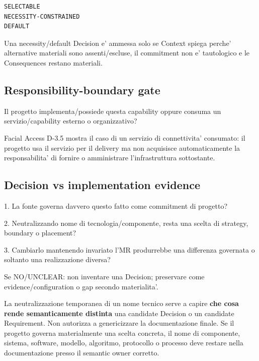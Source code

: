 \documentclass[11pt,a4paper]{article}
\begin{document}
\begin{lstlisting}
SELECTABLE
NECESSITY-CONSTRAINED
DEFAULT
\end{lstlisting}

Una necessity/default Decision e' ammessa solo se Context spiega perche' alternative materiali sono assenti/escluse, il commitment non e' tautologico e le Consequences restano materiali.

\subsection{Responsibility-boundary gate}

\begin{ddtacheck}[title={Domanda prima degli FR}]
Il progetto implementa/possiede questa capability oppure consuma un servizio/capability esterno o organizzativo?
\end{ddtacheck}

Facial Access D-3.5 mostra il caso di un servizio di connettivita' consumato: il progetto usa il servizio per il delivery ma non acquisisce automaticamente la responsabilita' di fornire o amministrare l'infrastruttura sottostante.

\subsection{Decision vs implementation evidence}
\holdouttag

\begin{ddtacheck}[title={Test DermaTriage per un technical fact}]
1. La fonte governa davvero questo fatto come commitment di progetto?\par
2. Neutralizzando nome di tecnologia/componente, resta una scelta di strategy, boundary o placement?\par
3. Cambiarlo mantenendo invariato l'MR produrrebbe una differenza governata o soltanto una realizzazione diversa?\par
Se NO/UNCLEAR: non inventare una Decision; preservare come evidence/configuration o gap secondo materialita'.
\end{ddtacheck}

\begin{ddtacore}[title={Neutralizzazione per classificare, non per riscrivere}]
La neutralizzazione temporanea di un nome tecnico serve a capire \textbf{che cosa rende semanticamente distinta} una candidate Decision o un candidate Requirement. Non autorizza a genericizzare la documentazione finale. Se il progetto governa materialmente una scelta concreta, il nome di componente, sistema, software, modello, algoritmo, protocollo o processo deve restare nella documentazione presso il semantic owner corretto.
\end{ddtacore}
\end{document}
